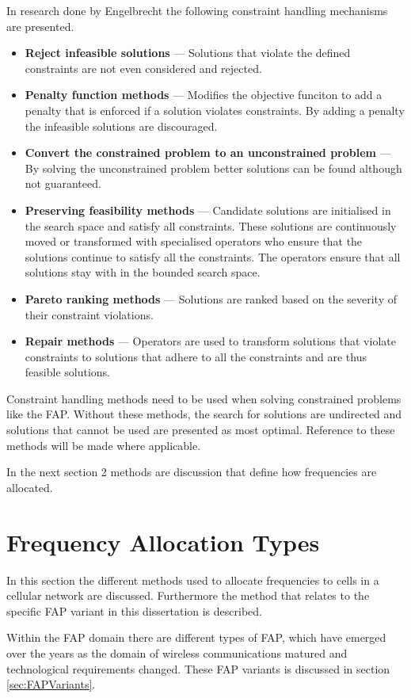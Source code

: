 In research done by Engelbrecht\cite{CompuIntelligenceIntro} the following constraint handling mechanisms are presented.
\begin{itemize}
\item{\textbf{Reject infeasible solutions}} --- Solutions that violate the defined constraints are not even considered and rejected.
\item{\textbf{Penalty function methods}} --- Modifies the objective funciton to add a penalty that is enforced if a solution violates constraints. By adding a penalty the infeasible solutions are discouraged.
\item{\textbf{Convert the constrained problem to an unconstrained problem}} --- By solving the unconstrained problem better solutions can be found although not guaranteed.
\item{\textbf{Preserving feasibility methods}} --- Candidate solutions are initialised in the search space and satisfy all constraints. These solutions are continuously moved or transformed with specialised operators who ensure that the solutions continue to satisfy all the constraints. The operators ensure that all solutions stay with in the bounded search space.
\item{\textbf{Pareto ranking methods}} --- Solutions are ranked based on the severity of their constraint violations.
\item{\textbf{Repair methods}} --- Operators are used to transform solutions that violate constraints to solutions that adhere to all the constraints and are thus feasible solutions.
\end{itemize}

Constraint handling methods need to be used when solving constrained problems like the FAP. Without these methods, the search for solutions are undirected and solutions that cannot be used are presented as most optimal. Reference to these methods will be made where applicable.

In the next section 2 methods are discussion that define how frequencies are allocated.
\section{Frequency Allocation Types}
\label{sec:FreqAssignmentTypes}
In this section the different methods used to allocate frequencies to cells in a cellular network are discussed. Furthermore the method that relates to the specific FAP variant in this dissertation is described.

Within the FAP domain there are different types of FAP, which have emerged over the years as the domain of wireless communications matured and technological requirements changed. These FAP variants is discussed in section \ref{sec:FAPVariants}.

